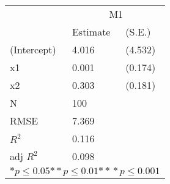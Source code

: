 \begin{tabular}{*{3}{l}}
\hline
                  & \multicolumn{2}{c}{M1}   \tabularnewline
                   &Estimate  &(S.E.)  \tabularnewline
 \hline
 \hline
   (Intercept)     &4.016   &   (4.532) \tabularnewline
   x1              &0.001   &   (0.174) \tabularnewline
   x2              &0.303   &   (0.181) \tabularnewline
 \hline
 N                 &100       &        \tabularnewline
 RMSE             &7.369         & \tabularnewline
 $R^2$             &0.116         & \tabularnewline
 adj $R^2$         &0.098         & \tabularnewline
 \hline
\hline
 
 \multicolumn{3}{c}{${*  p}\le 0.05$${*\!\!*  p}\le 0.01$${*\!\!*\!\!*  p}\le 0.001$}\tabularnewline
 \end{tabular}
